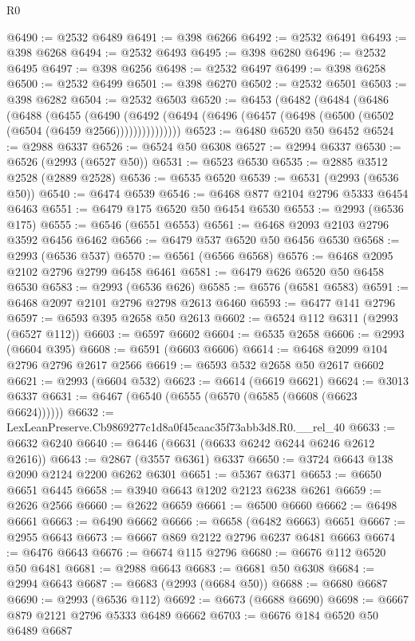 \begin{lexlean}{R0}
\begin{coremodule}
@6490 := @2532 @6489
@6491 := @398 @6266
@6492 := @2532 @6491
@6493 := @398 @6268
@6494 := @2532 @6493
@6495 := @398 @6280
@6496 := @2532 @6495
@6497 := @398 @6256
@6498 := @2532 @6497
@6499 := @398 @6258
@6500 := @2532 @6499
@6501 := @398 @6270
@6502 := @2532 @6501
@6503 := @398 @6282
@6504 := @2532 @6503
@6520 := @6453
    (@6482
      (@6484
        (@6486
          (@6488
            (@6455
              (@6490
                (@6492 (@6494 (@6496 (@6457 (@6498 (@6500 (@6502 (@6504 (@6459 @2566)))))))))))))))
@6523 := @6480 @6520 @50 @6452
@6524 := @2988 @6337
@6526 := @6524 @50 @6308
@6527 := @2994 @6337
@6530 := @6526 (@2993 (@6527 @50))
@6531 := @6523 @6530
@6535 := @2885 @3512 @2528 (@2889 @2528)
@6536 := @6535 @6520
@6539 := @6531 (@2993 (@6536 @50))
@6540 := @6474 @6539
@6546 := @6468 @877 @2104 @2796 @5333 @6454 @6463
@6551 := @6479 @175 @6520 @50 @6454 @6530
@6553 := @2993 (@6536 @175)
@6555 := @6546 (@6551 @6553)
@6561 := @6468 @2093 @2103 @2796 @3592 @6456 @6462
@6566 := @6479 @537 @6520 @50 @6456 @6530
@6568 := @2993 (@6536 @537)
@6570 := @6561 (@6566 @6568)
@6576 := @6468 @2095 @2102 @2796 @2799 @6458 @6461
@6581 := @6479 @626 @6520 @50 @6458 @6530
@6583 := @2993 (@6536 @626)
@6585 := @6576 (@6581 @6583)
@6591 := @6468 @2097 @2101 @2796 @2798 @2613 @6460
@6593 := @6477 @141 @2796
@6597 := @6593 @395 @2658 @50 @2613
@6602 := @6524 @112 @6311 (@2993 (@6527 @112))
@6603 := @6597 @6602
@6604 := @6535 @2658
@6606 := @2993 (@6604 @395)
@6608 := @6591 (@6603 @6606)
@6614 := @6468 @2099 @104 @2796 @2796 @2617 @2566
@6619 := @6593 @532 @2658 @50 @2617 @6602
@6621 := @2993 (@6604 @532)
@6623 := @6614 (@6619 @6621)
@6624 := @3013 @6337
@6631 := @6467 (@6540 (@6555 (@6570 (@6585 (@6608 (@6623 @6624))))))
@6632 := LexLeanPreserve.Cb9869277c1d8a0f45caac35f73abb3d8.R0.__rel_40
@6633 := @6632 @6240
@6640 := @6446 (@6631 (@6633 @6242 @6244 @6246 @2612 @2616))
@6643 := @2867 (@3557 @6361) @6337
@6650 := @3724 @6643 @138 @2090 @2124 @2200 @6262 @6301
@6651 := @5367 @6371
@6653 := @6650 @6651 @6445
@6658 := @3940 @6643 @1202 @2123 @6238 @6261
@6659 := @2626 @2566
@6660 := @2622 @6659
@6661 := @6500 @6660
@6662 := @6498 @6661
@6663 := @6490 @6662
@6666 := @6658 (@6482 @6663) @6651
@6667 := @2955 @6643
@6673 := @6667 @869 @2122 @2796 @6237 @6481 @6663
@6674 := @6476 @6643
@6676 := @6674 @115 @2796
@6680 := @6676 @112 @6520 @50 @6481
@6681 := @2988 @6643
@6683 := @6681 @50 @6308
@6684 := @2994 @6643
@6687 := @6683 (@2993 (@6684 @50))
@6688 := @6680 @6687
@6690 := @2993 (@6536 @112)
@6692 := @6673 (@6688 @6690)
@6698 := @6667 @879 @2121 @2796 @5333 @6489 @6662
@6703 := @6676 @184 @6520 @50 @6489 @6687

\end{coremodule}
\end{lexlean}
